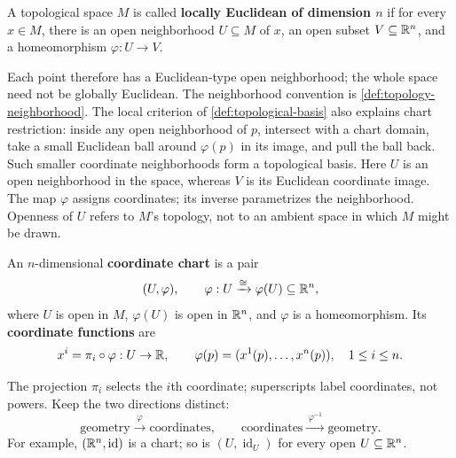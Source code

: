 \begin{definition}\label{def:locally-euclidean}
A topological space $M$ is called \textbf{locally Euclidean of dimension $n$}
if for every $x\in M$, there is an open neighborhood $U\subseteq M$ of $x$,
an open subset $V\subseteq\mathbb{R}^n$, and a homeomorphism $\varphi:U\to V$.
\end{definition}
Each point therefore has a Euclidean-type open neighborhood; the whole
space need not be globally Euclidean. The neighborhood convention is
\cref{def:topology-neighborhood}. The local criterion of
\cref{def:topological-basis} also explains chart restriction: inside any
open neighborhood of $p$, intersect with a chart domain, take a small
Euclidean ball around $\varphi(p)$ in its image, and pull the ball back.
Such smaller coordinate neighborhoods form a topological basis.
Here $U$ is an open neighborhood in the space, whereas $V$ is its Euclidean
coordinate image. The map $\varphi$ assigns coordinates; its inverse
parametrizes the neighborhood. Openness of $U$ refers to $M$'s topology,
not to an ambient space in which $M$ might be drawn.

\begin{definition}
An $n$-dimensional \textbf{coordinate chart} is a pair
\[
(U,\varphi),\qquad \varphi:U\xrightarrow{\cong}\varphi(U)\subseteq\mathbb{R}^n,
\]
where $U$ is open in $M$, $\varphi(U)$ is open in $\mathbb{R}^n$, and
$\varphi$ is a homeomorphism. Its \textbf{coordinate functions} are
\[
x^i=\pi_i\circ\varphi:U\to\mathbb{R},\qquad
\varphi(p)=(x^1(p),\ldots,x^n(p)),\quad 1\leq i\leq n.
\]
\end{definition}
The projection $\pi_i$ selects the $i$th coordinate; superscripts label
coordinates, not powers. Keep the two directions distinct:
\[
\text{geometry}\xrightarrow{\ \varphi\ }\text{coordinates},\qquad
\text{coordinates}\xrightarrow{\ \varphi^{-1}\ }\text{geometry}.
\]
For example, $(\mathbb{R}^n,\operatorname{id})$ is a chart; so is
$(U,\operatorname{id}_U)$ for every open $U\subseteq\mathbb{R}^n$.

